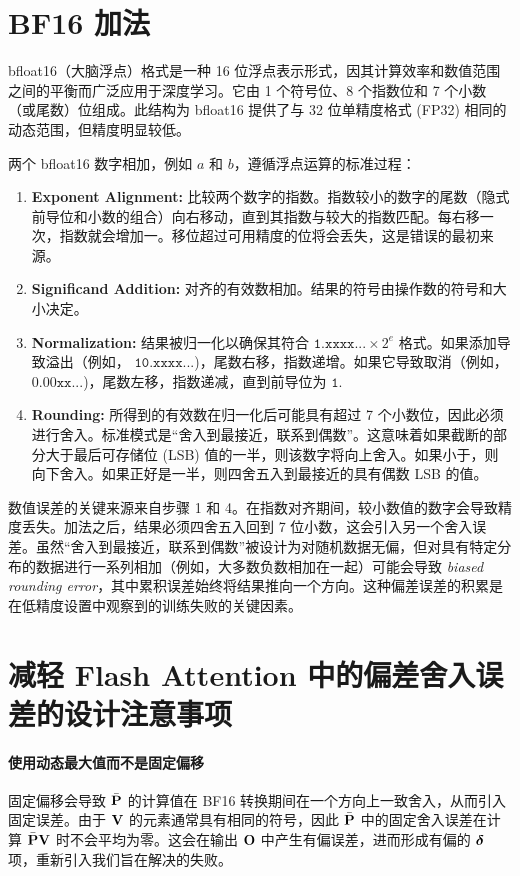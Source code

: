 \documentclass{article} %
\begin{document}
\section{BF16 加法}\label{app:bf16_add}

bfloat16（大脑浮点）格式是一种 16 位浮点表示形式，因其计算效率和数值范围之间的平衡而广泛应用于深度学习。它由 1 个符号位、8 个指数位和 7 个小数（或尾数）位组成。此结构为 bfloat16 提供了与 32 位单精度格式 (FP32) 相同的动态范围，但精度明显较低。

两个 bfloat16 数字相加，例如 $a$ 和 $b$，遵循浮点运算的标准过程：
\begin{enumerate}[leftmargin=*]
    \item \textbf{Exponent Alignment:} 比较两个数字的指数。指数较小的数字的尾数（隐式前导位和小数的组合）向右移动，直到其指数与较大的指数匹配。每右移一次，指数就会增加一。移位超过可用精度的位将会丢失，这是错误的最初来源。
    \item \textbf{Significand Addition:} 对齐的有效数相加。结果的符号由操作数的符号和大小决定。
    \item \textbf{Normalization:} 结果被归一化以确保其符合 $\mathtt{1.xxxx...} \times 2^{e}$ 格式。如果添加导致溢出（例如， $\mathtt{10.xxxx...}$)，尾数右移，指数递增。如果它导致取消（例如， $\mathtt{0.00xx...}$)，尾数左移，指数递减，直到前导位为 $\mathtt{1}$.
    \item \textbf{Rounding:} 所得到的有效数在归一化后可能具有超过 7 个小数位，因此必须进行舍入。标准模式是“舍入到最接近，联系到偶数”。这意味着如果截断的部分大于最后可存储位 (LSB) 值的一半，则该数字将向上舍入。如果小于，则向下舍入。如果正好是一半，则四舍五入到最接近的具有偶数 LSB 的值。
\end{enumerate}

数值误差的关键来源来自步骤 1 和 4。在指数对齐期间，较小数值的数字会导致精度丢失。加法之后，结果必须四舍五入回到 7 位小数，这会引入另一个舍入误差。虽然“舍入到最接近，联系到偶数”被设计为对随机数据无偏，但对具有特定分布的数据进行一系列相加（例如，大多数负数相加在一起）可能会导致 \emph{biased rounding error}，其中累积误差始终将结果推向一个方向。这种偏差误差的积累是在低精度设置中观察到的训练失败的关键因素。


\section{减轻 Flash Attention 中的偏差舍入误差的设计注意事项}\label{app:design_consider}

\paragraph{使用动态最大值而不是固定偏移} 固定偏移会导致 \ensuremath{\bar{\rmP}} 的计算值在 BF16 转换期间在一个方向上一致舍入，从而引入固定误差。由于 \ensuremath{\rmV} 的元素通常具有相同的符号，因此 \ensuremath{\bar{\rmP}} 中的固定舍入误差在计算 \ensuremath{\bar{\rmP}\rmV} 时不会平均为零。这会在输出 \ensuremath{\rmO} 中产生有偏误差，进而形成有偏的 \ensuremath{\rvdel} 项，重新引入我们旨在解决的失败。
\end{document}
